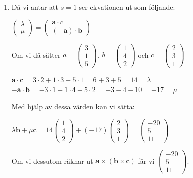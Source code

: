 \documentclass[a4paper]{report}
\begin{document}
\begin{enumerate}
\begin{enumerate}
            \item
                Då vi antar att $s=1$ ser ekvationen ut som följande:
                \begin{center}
                    $\begin{pmatrix}\lambda\\\mu\end{pmatrix}=\begin{pmatrix}\bm{a}\cdot c\\ (-\bm{a})\cdot \bm{b}\end{pmatrix}$
                \end{center}
                Om vi då sätter
                $a=\begin{pmatrix}3\\1\\5\end{pmatrix}$, $b=\begin{pmatrix}1\\4\\2\end{pmatrix}$ och $c=\begin{pmatrix}2\\3\\1\end{pmatrix}$\\
                \begin{center}
                    $\bm{a}\cdot \bm{c} = 3\cdot 2 + 1\cdot 3 + 5\cdot 1 = 6 + 3 + 5 = 14 = \lambda$\\
                    $-\bm{a}\cdot \bm{b} = -3\cdot 1 - 1\cdot 4 - 5\cdot 2 = -3 -4 -10 = -17 = \mu$
                \end{center}
                Med hjälp av dessa värden kan vi sätta:
                \begin{center}
                    $\lambda \bm{b} + \mu \bm{c} = 
                    14\begin{pmatrix}1\\4\\2\end{pmatrix} + (-17)\begin{pmatrix}2\\3\\1\end{pmatrix} =
                    \begin{pmatrix}-20\\5\\11\end{pmatrix}$
                \end{center}
                Om vi dessutom räknar ut $\bm{a}\times(\bm{b}\times\bm{c})$ får vi $\begin{pmatrix}-20\\5\\11\end{pmatrix}$.
        \end{enumerate}
\end{enumerate}
\end{document}
